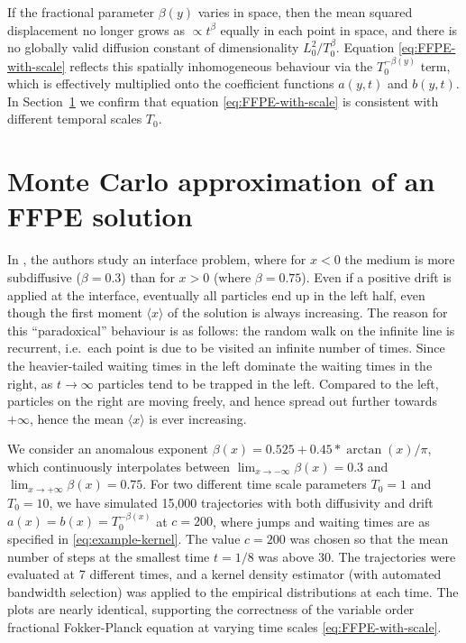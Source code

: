 \documentclass[a4paper,12pt]{elsarticle}
\numberwithin{equation}{section}
\theoremstyle{plain}
\theoremstyle{definition}
\theoremstyle{remark}
\numberwithin{equation}{section}
\newcommand{\1}{\mathbf 1}
\begin{document}
If the fractional parameter $\beta(y)$ varies in space, then the mean squared displacement no longer grows as $\propto t^\beta$ equally in each point in space, and 
there is no globally valid diffusion constant of dimensionality $L_0^2 / T_0^\beta$.  
Equation
\eqref{eq:FFPE-with-scale} reflects this spatially inhomogeneous behaviour
via the $T_0^{-\beta(y)}$ term, which is effectively multiplied onto the
coefficient functions $a(y,t)$ and $b(y,t)$.  
In Section~\ref{sec:examples}
we confirm that equation \eqref{eq:FFPE-with-scale} is consistent with 
different temporal scales $T_0$. 


\section{Monte Carlo approximation of an FFPE solution}
\label{sec:examples}

In \cite{Korabel2010}, the authors study an interface problem, where for 
$x<0$ the medium is more subdiffusive ($\beta = 0.3$) than for $x>0$ 
(where $\beta = 0.75$).  Even if a positive drift is applied at the 
interface, eventually all particles end up in the left half, even though 
the first moment $\langle x \rangle$ of the solution is always increasing. 
The reason for this ``paradoxical'' behaviour is as follows: the random 
walk on the infinite line is recurrent, i.e.\ each point is due to be 
visited an infinite number of times. Since the heavier-tailed waiting 
times in the left dominate the waiting times in the right, as $t \to 
\infty$ particles tend to be trapped in the left. Compared to the left, 
particles on the right are moving freely, and hence spread out further 
towards $+\infty$, hence the mean $\langle x \rangle$ is ever increasing. 

We consider an anomalous exponent $\beta(x) = 0.525 + 0.45 * \arctan(x)/ \pi$, which continuously interpolates between $\lim_{x \to -\infty} \beta(x) = 0.3$ 
and $\lim_{x \to +\infty} \beta(x) = 0.75$.
For two different time scale parameters $T_0 = 1$ and $T_0 = 10$, we have simulated 15,000 trajectories \cite{var-order-MC} with both diffusivity and drift $a(x) = b(x) = T_0^{-\beta(x)}$
at $c = 200$, where jumps and waiting times are as specified in \eqref{eq:example-kernel}. The value $c = 200$ was chosen so that the mean number of steps at the smallest time $t = 1/8$ was above $30$. The trajectories were evaluated at 7 different times, and a kernel density estimator (with automated bandwidth selection) was applied
to the empirical distributions at each time.  The plots are nearly identical, supporting the correctness of the variable order fractional Fokker-Planck equation at varying time scales \eqref{eq:FFPE-with-scale}. 
\end{document}
